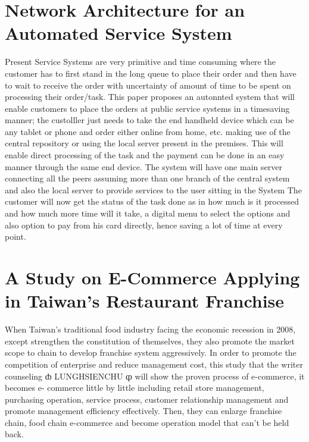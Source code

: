 \documentclass[12pt,a4paper]{report}
\begin{document}
\section{Network Architecture for an Automated Service
System}
\hspace{0.25cm}
\par
Present Service Systems are very primitive and
time consuming where the customer has to first stand in the
long queue to place their order and then have to wait to
receive the order with uncertainty of amount of time to be
spent on processing their order/task. This paper proposes an
autonnted system that will enable customers to place the
orders at public service systems in a timesaving manner; the
custolller just needs to take the end handheld device which
can be any tablet or phone and order either online from home,
etc. making use of the central repository or using the local
server present in the premises. This will enable direct
processing of the task and the payment can be done in an easy
manner through the same end device.
The system will have one main server connecting all the peers
assuming more than one branch of the central system and also
the local server to provide services to the user sitting in the
System The customer will now get the status of the task done
as in how much is it processed and how much more time will it
take, a digital menu to select the options and also option to
pay from his card directly, hence saving a lot of time at every
point.
\section{A Study on E-Commerce Applying in Taiwan’s Restaurant Franchise}
\hspace{0.25cm}
\par
When Taiwan’s traditional food industry facing the
economic recession in 2008, except strengthen the
constitution of themselves, they also promote the
market scope to chain to develop franchise system
aggressively. In order to promote the competition of
enterprise and reduce management cost, this study that
the writer counseling ȸ LUNGHSIENCHU ȹ will
show the proven process of e-commerce, it becomes e-
commerce little by little including retail store
management, purchasing operation, service process,
customer relationship management and promote
management efficiency effectively. Then, they can
enlarge franchise chain, food chain e-commerce and
become operation model that can’t be held back.
\end{document}
